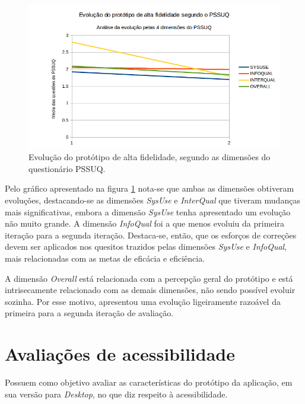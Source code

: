 	\begin{figure}[!htpb]
	  \centering
	  \includegraphics[scale=0.8]{editaveis/figuras/evolucao_prototipo_PSSUQ}
	  \caption[Evolução do protótipo de alta fidelidade, segundo as dimensões do questionário PSSUQ]
	    {Evolução do protótipo de alta fidelidade, segundo as dimensões do questionário PSSUQ.}
	  \label{evolucao_prototipo_PSSUQ}
	\end{figure}
	
	Pelo gráfico apresentado na figura \ref{evolucao_prototipo_PSSUQ} nota-se que ambas as dimensões obtiveram 
	evoluções, destacando-se as dimensões \textit{SysUse} e \textit{InterQual} que tiveram mudanças mais significativas, embora
	a dimensão \textit{SysUse} tenha apresentado um evolução não muito grande.
	A dimensão \textit{InfoQual} foi a que menos evoluiu da primeira iteração para a segunda iteração. Destaca-se, então,
	que os esforços de correções devem ser aplicados nos quesitos trazidos pelas dimensões \textit{SysUse} e \textit{InfoQual},
	mais relacionadas com as metas de eficácia e eficiência.
	
	A dimensão \textit{Overall} está relacionada com a percepção geral do protótipo e está intrisecamente relacionado com as 
	demais dimensões, não sendo possível evoluir sozinha. Por esse motivo, apresentou uma evolução ligeiramente razoável da primeira
	para a segunda iteração de avaliação.
      
    \pagebreak
    \section{Avaliações de acessibilidade}
     
    Possuem como objetivo avaliar as características do protótipo da aplicação, em sua versão para \textit{Desktop}, no 
    que diz respeito à acessibilidade.
    
